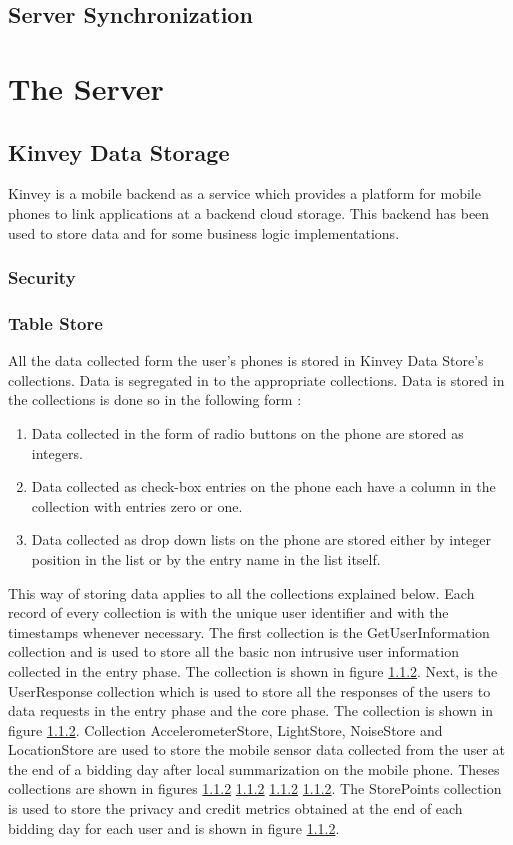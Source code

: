 \subsection{Server Synchronization}




\section{The Server}

\subsection{Kinvey Data Storage}

Kinvey is a mobile backend as a service which provides a platform for mobile phones to link applications at a backend cloud storage. This backend has been used to store data and for some business logic implementations.
\subsubsection{Security}

\subsubsection{Table Store}
All the data collected form the user's phones is stored in Kinvey Data Store's collections. Data is segregated in to the appropriate collections. Data is stored in the collections is done so in the following form :

\begin{enumerate}
    \item Data collected in the form of radio buttons on the phone are stored as integers.
    \item Data collected as check-box entries on the phone each have a column in the collection with entries zero or one.
    \item Data collected as drop down lists on the phone are stored either by integer position in the list or by the entry name in the list itself.
\end{enumerate}

This way of storing data applies to all the collections explained below. Each record of every collection is with the unique user identifier and with the timestamps whenever necessary.
The first collection is the GetUserInformation collection and is used to store all the basic non intrusive user information 
collected in the entry phase. The collection is shown in figure \ref{}. Next, is the UserResponse collection which is used to store all
the responses of the users to data requests in the entry phase and the core phase. The collection is shown in figure \ref{}. Collection AccelerometerStore, LightStore, NoiseStore and LocationStore are used to store the mobile sensor data collected from the user at the end of a bidding day after local summarization on the mobile phone. Theses collections are shown in figures \ref{} \ref{} \ref{} \ref{}. The StorePoints collection is used to store the privacy and credit metrics obtained at the end of each bidding day  for each user and is shown in figure \ref{}.

